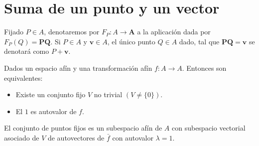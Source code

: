 \documentclass{./Geometria.tex}
\begin{document}
\section{Suma de un punto y un vector}
Fijado $P \in A$, denotaremos por $F_{P}: A \to \mathbf{A}$ a la aplicaci\'on dada por $F_{P}(Q)=\mathbf{PQ}$. Si $P \in A$ y $\mathbf{v}\in A$, el \'unico punto $Q\in A$ dado, tal que $\mathbf{PQ}=\mathbf{v}$ se denotar\'a como $P+\mathbf{v}$.

\begin{teorema}
Dados un espacio af\'in y una transformaci\'on af\'in $f:A \to A$. Entonces son equivalentes:
\begin{itemize}
    \item Existe un conjunto fijo $V$ no trivial $(V \neq \{ 0 \})$.
    \item El $1$ es autovalor de $f$.
\end{itemize}
El conjunto de puntos fijos es un subespacio af\'in de $A$ con subespacio vectorial asociado de $V$ de autovectores de $\bar{f}$ con autovalor $\lambda=1$.
\end{teorema}
\end{document}
